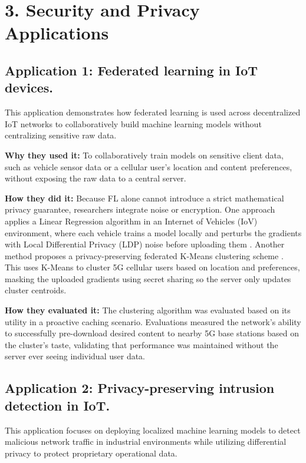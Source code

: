 \documentclass[letterpaper]{article}
\begin{document}
\pagebreak

\section{3. Security and Privacy Applications}

\subsection*{Application 1: Federated learning in IoT devices.}
This application demonstrates how federated learning is used across decentralized IoT networks to collaboratively build machine learning models without centralizing sensitive raw data.

\textbf{Why they used it:} To collaboratively train models on sensitive client data, such as vehicle sensor data or a cellular user's location and content preferences, without exposing the raw data to a central server.

\textbf{How they did it:} Because FL alone cannot introduce a strict mathematical privacy guarantee, researchers integrate noise or encryption. One approach applies a Linear Regression algorithm in an Internet of Vehicles (IoV) environment, where each vehicle trains a model locally and perturbs the gradients with Local Differential Privacy (LDP) noise before uploading them \parencite{zhao2020}. Another method proposes a privacy-preserving federated K-Means clustering scheme \parencite{liu2020}. This uses K-Means to cluster 5G cellular users based on location and preferences, masking the uploaded gradients using secret sharing so the server only updates cluster centroids.

\textbf{How they evaluated it:} The clustering algorithm was evaluated based on its utility in a proactive caching scenario. Evaluations measured the network's ability to successfully pre-download desired content to nearby 5G base stations based on the cluster's taste, validating that performance was maintained without the server ever seeing individual user data.

\subsection*{Application 2: Privacy-preserving intrusion detection in IoT.}
This application focuses on deploying localized machine learning models to detect malicious network traffic in industrial environments while utilizing differential privacy to protect proprietary operational data.
\end{document}
